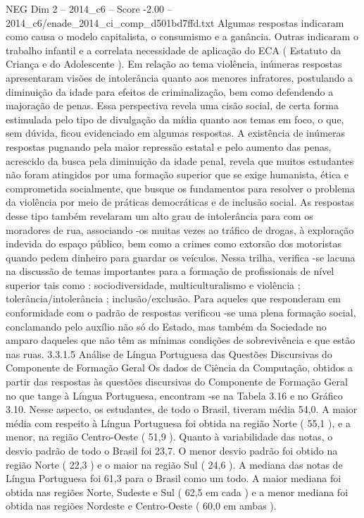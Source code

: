 \begin{textsample}{NEG Dim 2 – 2014\_c6 – Score -2.00 – 2014\_c6/enade\_2014\_ci\_comp\_d501bd7ffd.txt}
Algumas respostas indicaram como causa o modelo capitalista, o consumismo e a ganância.
Outras indicaram o trabalho infantil e a correlata necessidade de aplicação do ECA ( Estatuto da Criança e do Adolescente ).
Em relação ao tema violência, inúmeras respostas apresentaram visões de intolerância quanto aos menores infratores, postulando a diminuição da idade para efeitos de criminalização, bem como defendendo a majoração de penas.
Essa perspectiva revela uma cisão social, de certa forma estimulada pelo tipo de divulgação da mídia quanto aos temas em foco, o que, sem dúvida, ficou evidenciado em algumas respostas.
A existência de inúmeras respostas pugnando pela maior repressão estatal e pelo aumento das penas, acrescido da busca pela diminuição da idade penal, revela que muitos estudantes não foram atingidos por uma formação superior que se exige humanista, ética e comprometida socialmente, que busque os fundamentos para resolver o problema da violência por meio de práticas democráticas e de inclusão social.
As respostas desse tipo também revelaram um alto grau de intolerância para com os moradores de rua, associando -os muitas vezes ao tráfico de drogas, à exploração indevida do espaço público, bem como a crimes como extorsão dos motoristas quando pedem dinheiro para guardar os veículos.
Nessa trilha, verifica -se lacuna na discussão de temas importantes para a formação de profissionais de nível superior tais como : sociodiversidade, multiculturalismo e violência ; tolerância/intolerância ; inclusão/exclusão.
Para aqueles que responderam em conformidade com o padrão de respostas verificou -se uma plena formação social, conclamando pelo auxílio não só do Estado, mas também da Sociedade no amparo daqueles que não têm as mínimas condições de sobrevivência e que estão nas ruas. 3.3.1.5 Análise de Língua Portuguesa das Questões Discursivas do Componente de Formação Geral Os dados de Ciência da Computação, obtidos a partir das respostas às questões discursivas do Componente de Formação Geral no que tange à Língua Portuguesa, encontram -se na Tabela 3.16 e no Gráfico 3.10.
Nesse aspecto, os estudantes, de todo o Brasil, tiveram média 54,0.
A maior média com respeito à Língua Portuguesa foi obtida na região Norte ( 55,1 ), e a menor, na região Centro-Oeste ( 51,9 ).
Quanto à variabilidade das notas, o desvio padrão de todo o Brasil foi 23,7.
O menor desvio padrão foi obtido na região Norte ( 22,3 ) e o maior na região Sul ( 24,6 ).
A mediana das notas de Língua Portuguesa foi 61,3 para o Brasil como um todo.
A maior mediana foi obtida nas regiões Norte, Sudeste e Sul ( 62,5 em cada ) e a menor mediana foi obtida nas regiões Nordeste e Centro-Oeste ( 60,0 em ambas ).

\end{textsample}
